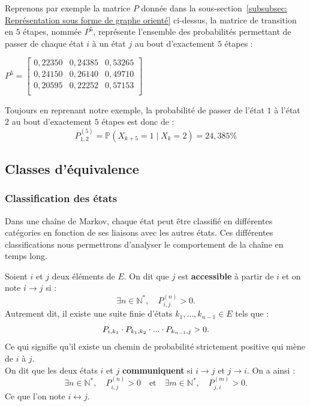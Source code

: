 \documentclass{article}
\begin{document}
\begin{tcolorbox}[colback=white,colframe=yellow!80!black,title=Exemple, breakable]
Reprenons par exemple la matrice $P$ donnée dans la sous-section~\ref{subsubsec: Représentation sous forme de graphe orienté} ci-dessus, la matrice de transition en $5$ étapes, nommée $P^{5}$, représente l'ensemble des probabilités permettant de passer de chaque état $i$ à un état $j$ au bout d'exactement $5$ étapes :
\begin{center}
$
P^{5} = \begin{bmatrix}
0,22350 & 0,24385 & 0,53265 \\
0,24150 & 0,26140 & 0,49710 \\
0,20595 & 0,22252 & 0,57153 \\
\end{bmatrix}
$
\end{center}
Toujours en reprenant notre exemple, la probabilité de passer de l'état $1$ à l'état $2$ au bout d'exactement $5$ étapes est donc de :
\[
P_{1,2}^{(5)} = \mathbb{P}(X_{k+5} = 1 \mid X_k = 2) = 24,385\%
\]
\end{tcolorbox}

\subsection{Classes d'équivalence}

\subsubsection{Classification des états}
\label{subsubsec: Les différents types d'états}

Dans une chaîne de Markov, chaque état peut être classifié en différentes catégories en fonction de ses liaisons avec les autres états. 
Ces différentes classifications nous permettrons d'analyser le comportement de la chaîne en temps long. 

\begin{tcolorbox}[colback=white,colframe=red!80!black,title=Accessibilité et communication]
Soient $i$ et $j$ deux éléments de $E$. On dit que $j$ est \textbf{accessible} à partir de $i$ et on note $i \to j$ si :
\[
\exists n \in \mathbb{N}^{*}, \quad P_{i,j}^{(n)} > 0.
\]
Autrement dit, il existe une suite finie d'états $k_1, \dots, k_{n-1} \in E$ tels que :
\[
P_{i,k_1} \cdot P_{k_1,k_2}\cdot ... \cdot P_{k_{n-1},j} > 0. \\
\]
Ce qui signifie qu'il existe un chemin de probabilité strictement positive qui mène de $i$ à $j$. \\

On dit que les deux états $i$ et $j$ \textbf{communiquent} si $i \rightarrow j$ et $j \rightarrow i$. On a ainsi :
\[
\exists n \in \mathbb{N}^{*}, \quad P_{i,j}^{(n)} > 0 \quad \text{et} \quad \exists m \in \mathbb{N}^{*}, \quad P_{j,i}^{(m)} > 0.
\]
Ce que l'on note $i \leftrightarrow j$.
\end{tcolorbox}
\end{document}
